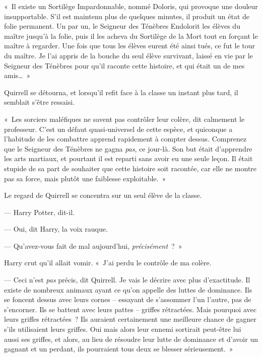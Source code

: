 «~Il existe un Sortilège Impardonnable, nommé Doloris, qui provoque une douleur insupportable.
S'il est maintenu plus de quelques minutes, il produit un état de folie permanent.
Un par un, le Seigneur des Ténèbres Endolorit les élèves du maître jusqu'à la folie, puis il les acheva du Sortilège de la Mort tout en forçant le maître à regarder.
Une fois que tous les élèves eurent été ainsi tués, ce fut le tour du maître.
Je l'ai appris de la bouche du seul élève survivant, laissé en vie par le Seigneur des Ténèbres pour qu'il raconte cette histoire, et qui était un de mes amis…~»

Quirrell se détourna, et lorsqu'il refit face à la classe un instant plus tard, il semblait s'être ressaisi.

«~Les sorciers maléfiques ne savent pas contrôler leur colère, dit calmement le professeur.
C'est un défaut quasi-universel de cette espèce, et quiconque a l'habitude de les combattre apprend rapidement à compter dessus.
Comprenez que le Seigneur des Ténèbres ne gagna \emph{pas}, ce jour-là.
Son but était d'apprendre les arts martiaux, et pourtant il est reparti sans avoir eu une seule leçon.
Il était stupide de sa part de souhaiter que cette histoire soit racontée, car elle ne montre pas sa force, mais plutôt une faiblesse exploitable.~»

Le regard de Quirrell se concentra sur un seul élève de la classe.

— Harry Potter, dit-il.

--- Oui, dit Harry, la voix rauque.

--- Qu'avez-vous fait de mal aujourd'hui, \emph{précisément}~?~»

Harry crut qu'il allait vomir.
«~J'ai perdu le contrôle de ma colère.

--- Ceci n'est \emph{pas} précis, dit Quirrell.
Je vais le décrire avec plus d'exactitude.
Il existe de nombreux animaux ayant ce qu'on appelle des luttes de dominance.
Ils se foncent dessus avec leurs cornes -- essayant de s'assommer l'un l'autre, pas de s'encorner.
Ils se battent avec leurs pattes -- griffes rétractées.
Mais pourquoi avec leurs griffes rétractées~?
Ils auraient certainement une meilleure chance de gagner s'ils utilisaient leurs griffes.
Oui mais alors leur ennemi sortirait peut-être lui aussi ses griffes, et alors, au lieu de résoudre leur lutte de dominance et d'avoir un gagnant et un perdant, ils pourraient tous deux se blesser sérieusement.~»

